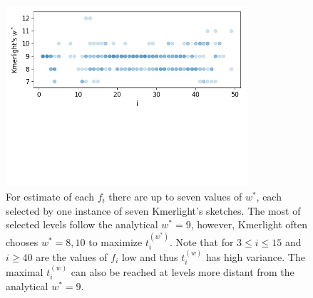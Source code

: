 \begin{figure}
\centerline{\includegraphics[width=0.8\textwidth, trim={0cm, 5.5cm, 0cm, 0cm}, clip]{images/kmerlight_wstar.png}}
\caption[$w^*$ selected by Kmerlight]{For estimate of each $f_i$ there are up to seven
values of $w^*$, each selected by one instance of seven Kmerlight's sketches. The most of 
selected levels follow the analytical $w^* = 9$, however, Kmerlight often chooses 
$w^* = 8, 10$ to maximize $t_i^{(w^*)}$. Note that for $3\leq i \leq 15$ and $i \geq 40$
are the values of $f_i$ low and thus $t_i^{(w)}$ has high variance. The maximal
$t_i^{(w)}$ can also be reached at levels more distant from the analytical $w^* = 9$.}
\label{img:w-selected-by-kmerlight}
\end{figure}

